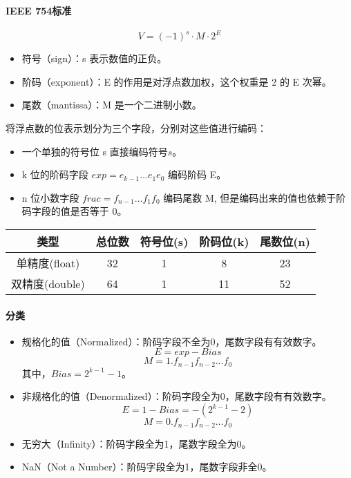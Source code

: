 \paragraph{IEEE 754标准}
$$V = (-1)^{s} \cdot M \cdot 2^E$$
\begin{itemize}
    \item 符号（sign）：s 表示数值的正负。
    \item 阶码（exponent）：E 的作用是对浮点数加权，这个权重是 2 的 E 次幂。
    \item 尾数（mantissa）：M 是一个二进制小数。
\end{itemize}
将浮点数的位表示划分为三个字段，分别对这些值进行编码：
\begin{itemize}
    \item 一个单独的符号位 s 直接编码符号$s$。
    \item k 位的阶码字段 $exp=e_{k-1}\ldots e_1e_0$ 编码阶码 E。
    \item n 位小数字段 $frac=f_{n-1}\ldots f_1f_0$ 编码尾数 M, 但是编码出来的值也依赖于阶码字段的值是否等于 0。
\end{itemize}
\begin{table}[htbp]
    \centering
    \begin{tabular}{|c|c|c|c|c|}
        \hline
        类型      & 总位数 & 符号位(s) & 阶码位(k) & 尾数位(n) \\
        \hline
        单精度(float)  & 32    & 1       & 8       & 23      \\
        \hline
        双精度(double) & 64    & 1       & 11      & 52      \\
        \hline
    \end{tabular}
\end{table}

\paragraph{分类}
\begin{itemize}
    \item 规格化的值（Normalized）：阶码字段不全为0，尾数字段有有效数字。
    $$E=exp - Bias$$
    $$M=1.f_{n-1}f_{n-2}\ldots f_0$$
    其中，$Bias = 2^{k-1} - 1$。
    \item 非规格化的值（Denormalized）：阶码字段全为0，尾数字段有有效数字。
    $$E = 1 - Bias = - (2^{k-1} - 2)$$
    $$M = 0.f_{n-1}f_{n-2}\ldots f_0$$
    \item 无穷大（Infinity）：阶码字段全为1，尾数字段全为0。
    \item NaN（Not a Number）：阶码字段全为1，尾数字段非全0。
\end{itemize}

